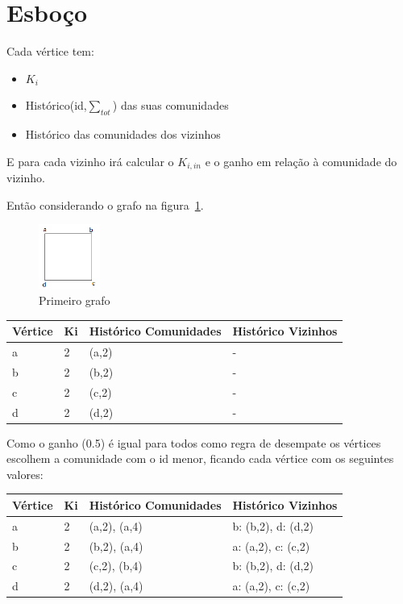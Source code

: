 \documentclass[a4paper,10pt]{report}
\begin{document}
\section*{Esboço}

Cada vértice tem:
\begin{itemize}
	\item $K_i$
	\item Histórico(id,$\sum_{tot}$) das suas comunidades
	\item Histórico das comunidades dos vizinhos
\end{itemize}
E para cada vizinho irá calcular o $K_{i,in}$ e o ganho em relação à comunidade do vizinho.


Então considerando o grafo na figura~\ref{fig:esb1}.

\begin{figure}
\includegraphics[width=20mm]{esboco1}
\caption{Primeiro grafo\label{fig:esb1}}
\end{figure}


\begin{table}[h]
	\centering
		\begin{tabular}{ l | l | l | l }
		\hline
			Vértice & Ki & Histórico Comunidades & Histórico Vizinhos \\ \hline
			a & 2 & (a,2) & - \\ \hline
			b & 2 & (b,2) & - \\ \hline
			c & 2 & (c,2) & - \\ \hline
			d & 2 & (d,2) & - \\ \hline
		\end{tabular}
\end{table}

Como o ganho (0.5) é igual para todos como regra de desempate os vértices escolhem a comunidade com o id menor, ficando cada vértice com os seguintes valores:

\begin{table}[h]
	\centering
		\begin{tabular}{ l | l | l | l }
		\hline
			Vértice & Ki & Histórico Comunidades & Histórico Vizinhos \\ \hline
			a & 2 & (a,2), (a,4) &  b: (b,2), d: (d,2)\\ \hline
			b & 2 & (b,2), (a,4) &  a: (a,2), c: (c,2)\\ \hline
			c & 2 & (c,2), (b,4) &  b: (b,2), d: (d,2)\\ \hline
			d & 2 & (d,2), (a,4) &  a: (a,2), c: (c,2)\\ \hline
		\end{tabular}
\end{table}
\end{document}

